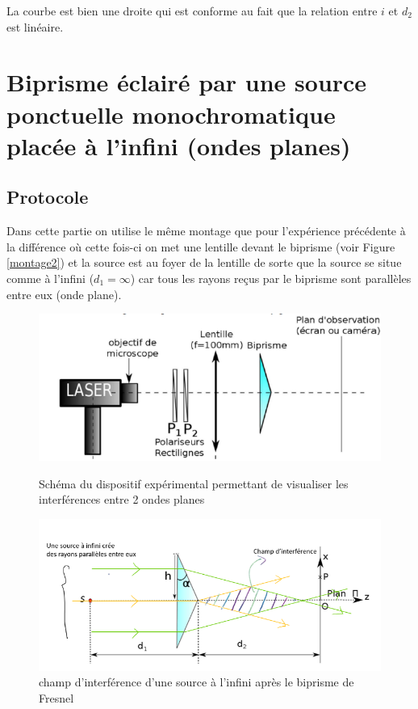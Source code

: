 \documentclass[11pt, a4paper]{article}
\begin{document}
La courbe est bien une droite qui est conforme au fait que la relation entre $i$ et $d_2$ est linéaire.


\section{Biprisme éclairé par une source ponctuelle monochromatique placée à l'infini (ondes planes)}
\subsection{Protocole}
Dans cette partie on utilise le même montage que pour l'expérience précédente à la différence où cette fois-ci on met une lentille devant le biprisme (voir Figure \ref{montage2}) et la source est au foyer de la lentille de sorte que la source se situe comme à l'infini ($d_1=\infty$) car tous les rayons reçus par le biprisme sont parallèles entre eux (onde plane).

\begin{figure}[htbp]
    \centering
    \begin{minipage}[t]{0.48\textwidth}
        \centering
        \includegraphics[width=\textwidth]{montage2.png}
        \caption{Schéma du dispositif expérimental permettant de visualiser les interférences entre 2 ondes planes}
        \label{montage2}
    \end{minipage}
    \hfill
    \begin{minipage}[t]{0.48\textwidth}
        \centering
        \includegraphics[width=\textwidth]{champs2.png}
        \caption{champ d'interférence d'une source à l'infini après le biprisme de Fresnel}
        \label{champs2}
    \end{minipage}
\end{figure}
\end{document}

